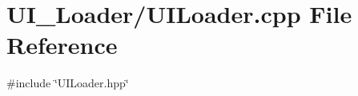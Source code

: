 \section{U\+I\+\_\+\+Loader/\+U\+I\+Loader.cpp File Reference}
\label{_u_i_loader_8cpp}
{\ttfamily \#include \char`\"{}U\+I\+Loader.\+hpp\char`\"{}}\newline

